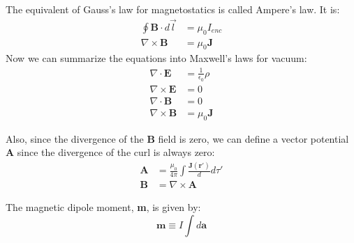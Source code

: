\documentclass[a4paper, 11pt]{article}
\begin{document}
		The equivalent of Gauss's law for magnetostatics is called Ampere's law. It is: 
			\begin{align}
				\oint \mathbf{B} \cdot d\vec{l} &= \mu_0 I_{enc} \\ 
					\nabla \times \mathbf{B} &= \mu_0 \mathbf{J} 
			\end{align}
		Now we can summarize the equations into Maxwell's laws for vacuum: 
			\begin{align}
				\nabla \cdot \mathbf{E} &= \frac{1}{\epsilon_0}\rho \\ 
				\nabla \times \mathbf{E} &= 0 \\ 
				\nabla \cdot \mathbf{B} &= 0 \\ 
				\nabla \times \mathbf{B} &= \mu_0 \mathbf{J} 
			\end{align} 
			
		Also, since the divergence of the \textbf{B} field is zero, we can define a vector potential \textbf{A} since the divergence of the curl is always zero: 
			\begin{align}
				\mathbf{A} &= \frac{\mu_0}{4\pi}\int \frac{\mathbf{J(r')}}{d}d\tau' \\ 
				\mathbf{B} &= \nabla \times \mathbf{A} 
			\end{align} 
		
		The magnetic dipole moment, \textbf{m}, is given by: 
			\begin{equation}
				\mathbf{m} \equiv I \int d\mathbf{a}
			\end{equation}
\end{document}
